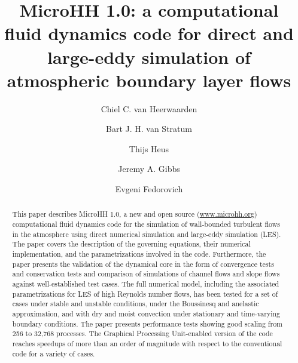 \documentclass[gmd]{copernicus}
\begin{document}
\linenumbers
\raggedbottom

\title{MicroHH 1.0: a computational fluid dynamics code for direct and large-eddy simulation of atmospheric boundary layer flows}


\author[1,2]{Chiel C. van Heerwaarden}
\author[1,2]{Bart J. H. van Stratum}
\author[3]{Thijs Heus}
\author[4]{Jeremy A. Gibbs}
\author[5]{Evgeni Fedorovich}










\received{}
\pubdiscuss{} %
\revised{}
\accepted{}
\published{}




\maketitle  %

\begin{abstract}
This paper describes MicroHH 1.0, a new and open source (\url{www.microhh.org}) computational fluid dynamics code for the simulation of wall-bounded turbulent flows in the atmosphere using direct numerical simulation and large-eddy simulation (LES). The paper covers the description of the governing equations, their numerical implementation, and the parametrizations involved in the code. Furthermore, the paper presents the validation of the dynamical core in the form of convergence tests and conservation tests and comparison of simulations of channel flows and slope flows against well-established test cases. The full numerical model, including the associated parametrizations for LES of high Reynolds number flows, has been tested for a set of cases under stable and unstable conditions, under the Boussinesq and anelastic approximation, and with dry and moist convection under stationary and time-varying boundary conditions. The paper presents performance tests showing good scaling from 256 to 32,768 processes. The Graphical Processing Unit-enabled version of the code reaches speedups of more than an order of magnitude with respect to the conventional code for a variety of cases.
\end{abstract}
\end{document}
